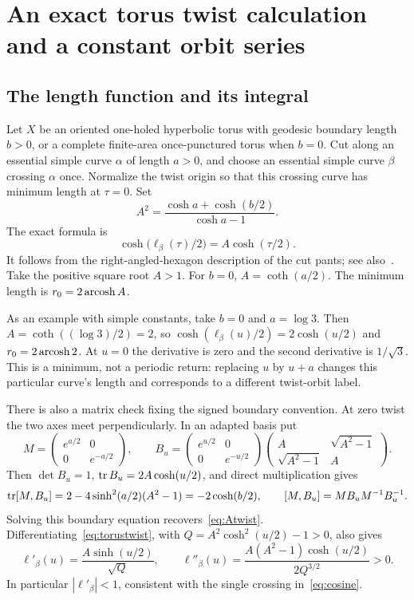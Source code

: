 \section{An exact torus twist calculation and a constant orbit series}
\label{sec:exacttwist}

\subsection{The length function and its integral}

Let $X$ be an oriented one-holed hyperbolic torus with geodesic boundary
length $b>0$, or a complete finite-area once-punctured torus when $b=0$.
Cut along an essential simple curve $\alpha$ of length $a>0$, and choose
an essential simple curve $\beta$ crossing $\alpha$ once.
Normalize the twist origin so that this crossing curve
has minimum length at $\tau=0$. Set
\begin{equation}
 A^2=\frac{\cosh a+\cosh(b/2)}{\cosh a-1}.
 \label{eq:Atwist}
\end{equation}
The exact formula is
\begin{equation}
 \boxed{\cosh\bigl(\ell_\beta(\tau)/2\bigr)=A\cosh(\tau/2).}
 \label{eq:torustwist}
\end{equation}
It follows from the right-angled-hexagon description of the cut pants;
see also~\cite[Proposition 3.1, pp.~5--6]{ALPS}. Take the positive square
root $A>1$. For $b=0$,
$A=\coth(a/2)$. The minimum length is $r_0=2\operatorname{arcosh} A$.

As an example with simple constants, take $b=0$ and $a=\log3$.
Then $A=\coth((\log3)/2)=2$, so
$\cosh(\ell_\beta(u)/2)=2\cosh(u/2)$ and
$r_0=2\operatorname{arcosh}2$. At $u=0$ the derivative is zero and the
second derivative is $1/\sqrt3$. This is a minimum, not a
periodic return: replacing $u$ by $u+a$ changes this particular
curve's length and corresponds to a different twist-orbit label.

There is also a matrix check fixing the signed boundary convention.
At zero twist the two axes meet perpendicularly. In an adapted basis put
\[
 M=\begin{pmatrix}e^{a/2}&0\\0&e^{-a/2}\end{pmatrix},\qquad
 B_u=\begin{pmatrix}e^{u/2}&0\\0&e^{-u/2}\end{pmatrix}
      \begin{pmatrix}A&\sqrt{A^2-1}\\\sqrt{A^2-1}&A\end{pmatrix}.
\]
Then $\det B_u=1$, $\operatorname{tr} B_u=2A\cosh(u/2)$, and direct multiplication gives
\[
 \operatorname{tr}[M,B_u]=2-4\sinh^2(a/2)(A^2-1)=-2\cosh(b/2),
 \qquad [M,B_u]=MB_uM^{-1}B_u^{-1}.
\]
Solving this boundary equation recovers~\eqref{eq:Atwist}.
Differentiating~\eqref{eq:torustwist}, with
$Q=A^2\cosh^2(u/2)-1>0$, also gives
\begin{equation}
 \ell'_\beta(u)=\frac{A\sinh(u/2)}{\sqrt Q},\qquad
 \ell''_\beta(u)=\frac{A(A^2-1)\cosh(u/2)}{2Q^{3/2}}>0.
 \label{eq:torustwistderivatives}
\end{equation}
In particular $|\ell'_\beta|<1$, consistent with the single crossing
in~\eqref{eq:cosine}.

